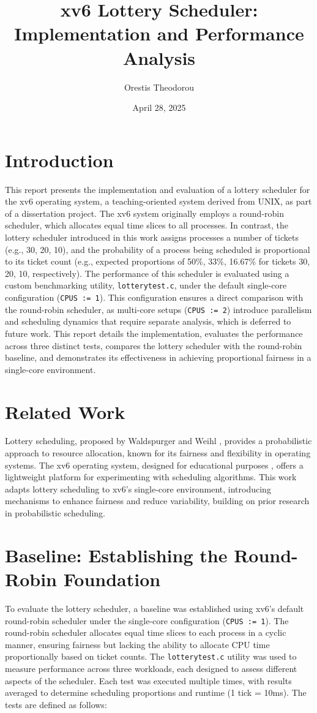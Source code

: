\documentclass{article}
\title{xv6 Lottery Scheduler: Implementation and Performance Analysis}
\author{Orestis Theodorou}
\date{April 28, 2025}
\begin{document}
\maketitle

\section{Introduction}
This report presents the implementation and evaluation of a lottery scheduler for the xv6 operating system, a teaching-oriented system derived from UNIX, as part of a dissertation project. The xv6 system originally employs a round-robin scheduler, which allocates equal time slices to all processes. In contrast, the lottery scheduler introduced in this work assigns processes a number of tickets (e.g., 30, 20, 10), and the probability of a process being scheduled is proportional to its ticket count (e.g., expected proportions of 50\%, 33\%, 16.67\% for tickets 30, 20, 10, respectively). The performance of this scheduler is evaluated using a custom benchmarking utility, \texttt{lotterytest.c}, under the default single-core configuration (\texttt{CPUS := 1}). This configuration ensures a direct comparison with the round-robin scheduler, as multi-core setups (\texttt{CPUS := 2}) introduce parallelism and scheduling dynamics that require separate analysis, which is deferred to future work. This report details the implementation, evaluates the performance across three distinct tests, compares the lottery scheduler with the round-robin baseline, and demonstrates its effectiveness in achieving proportional fairness in a single-core environment.

\section{Related Work}
Lottery scheduling, proposed by Waldspurger and Weihl \cite{waldspurger1994lottery}, provides a probabilistic approach to resource allocation, known for its fairness and flexibility in operating systems. The xv6 operating system, designed for educational purposes \cite{xv6}, offers a lightweight platform for experimenting with scheduling algorithms. This work adapts lottery scheduling to xv6’s single-core environment, introducing mechanisms to enhance fairness and reduce variability, building on prior research in probabilistic scheduling.

\section{Baseline: Establishing the Round-Robin Foundation}
To evaluate the lottery scheduler, a baseline was established using xv6’s default round-robin scheduler under the single-core configuration (\texttt{CPUS := 1}). The round-robin scheduler allocates equal time slices to each process in a cyclic manner, ensuring fairness but lacking the ability to allocate CPU time proportionally based on ticket counts. The \texttt{lotterytest.c} utility was used to measure performance across three workloads, each designed to assess different aspects of the scheduler. Each test was executed multiple times, with results averaged to determine scheduling proportions and runtime (1 tick = 10ms). The tests are defined as follows:
\end{document}
